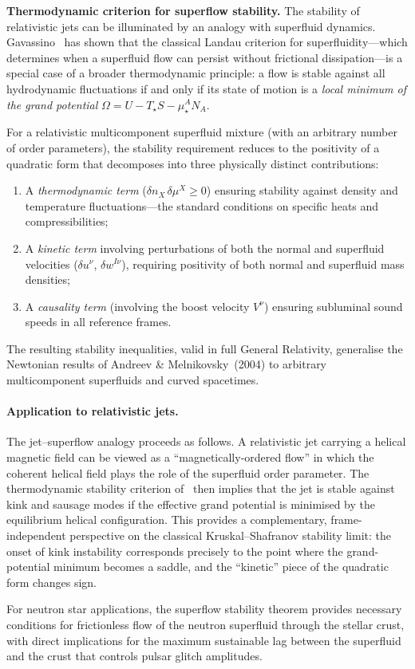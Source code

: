 \begin{relcorrection}
\textbf{Thermodynamic criterion for superflow stability.}
The stability of relativistic jets can be illuminated by an analogy with
superfluid dynamics.  Gavassino~\cite{GavassinoSuperflows2025} has shown
that the classical Landau criterion for superfluidity---which determines
when a superfluid flow can persist without frictional dissipation---is a
special case of a broader thermodynamic principle: a flow is stable
against all hydrodynamic fluctuations if and only if its state of motion
is a \emph{local minimum of the grand potential}
$\Omega = U - T_\star S - \mu_\star^A N_A$.

For a relativistic multicomponent superfluid mixture (with an arbitrary
number of order parameters), the stability requirement reduces to the
positivity of a quadratic form that decomposes into three physically
distinct contributions:
\begin{enumerate}
  \item A \emph{thermodynamic term} ($\delta n_X\,\delta\mu^X \geq 0$)
    ensuring stability against density and temperature fluctuations---the
    standard conditions on specific heats and compressibilities;
  \item A \emph{kinetic term} involving perturbations of both the normal
    and superfluid velocities ($\delta u^\nu$, $\delta w^{I\nu}$),
    requiring positivity of both normal and superfluid mass densities;
  \item A \emph{causality term} (involving the boost velocity $V^\nu$)
    ensuring subluminal sound speeds in all reference frames.
\end{enumerate}
The resulting stability inequalities, valid in full General Relativity,
generalise the Newtonian results of Andreev \&
Melnikovsky~(2004) to arbitrary multicomponent superfluids and curved
spacetimes.

\paragraph{Application to relativistic jets.}
The jet--superflow analogy proceeds as follows.  A relativistic jet
carrying a helical magnetic field can be viewed as a
``magnetically-ordered flow'' in which the coherent helical field
plays the role of the superfluid order parameter.  The thermodynamic
stability criterion of~\cite{GavassinoSuperflows2025} then implies
that the jet is stable against kink and sausage modes if the
effective grand potential is minimised by the equilibrium helical
configuration.  This provides a complementary, frame-independent
perspective on the classical Kruskal--Shafranov stability limit:
the onset of kink instability corresponds precisely to the point
where the grand-potential minimum becomes a saddle, and the
``kinetic'' piece of the quadratic form changes sign.

For neutron star applications, the superflow stability theorem
provides necessary conditions for frictionless flow of the neutron
superfluid through the stellar crust, with direct implications for
the maximum sustainable lag between the superfluid and the crust
that controls pulsar glitch amplitudes.
\end{relcorrection}
